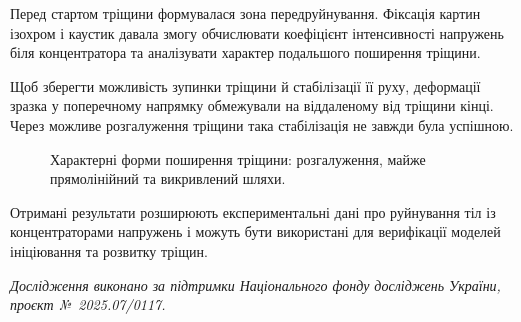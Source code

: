 Перед стартом тріщини формувалася зона передруйнування. Фіксація картин ізохром і каустик давала змогу обчислювати коефіцієнт інтенсивності напружень біля концентратора та аналізувати характер подальшого поширення тріщини.

Щоб зберегти можливість зупинки тріщини й стабілізації її руху, деформації зразка у поперечному напрямку обмежували на віддаленому від тріщини кінці. Через можливе розгалуження тріщини така стабілізація не завжди була успішною.

\begin{figure}[htbp]
\centering
{}
\caption{Характерні форми поширення тріщини: розгалуження, майже прямолінійний та викривлений шляхи.}
\end{figure}

Отримані результати розширюють експериментальні дані про руйнування тіл із концентраторами напружень і можуть бути використані для верифікації моделей ініціювання та розвитку тріщин.

\textit{Дослідження виконано за підтримки Національного фонду досліджень України, проєкт №~2025.07/0117.}
